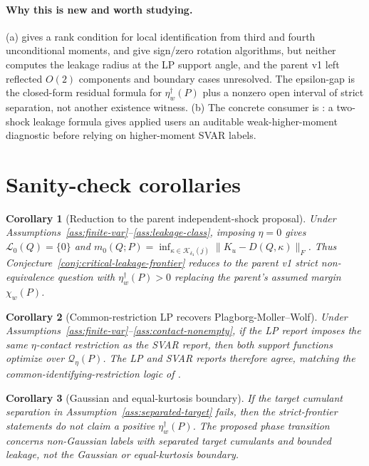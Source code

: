 \documentclass[11pt]{article}
\theoremstyle{definition}
\theoremstyle{plain}
\newtheorem{corollary}{Corollary}
\theoremstyle{remark}
\begin{document}
\paragraph{Why this is new and worth studying.}
(a) \citet[Section~3]{Guay2021} gives a rank condition for local identification from third and fourth unconditional moments, and \citet[Section~2 and Algorithms~1--2]{AriasRubioRamirezWaggoner2018} give sign/zero rotation algorithms, but neither computes the leakage radius at the LP support angle, and the parent v1 left reflected \(O(2)\) components and boundary cases unresolved.  The epsilon-gap is the closed-form residual formula for \(\eta_w^\dagger(P)\) plus a nonzero open interval of strict separation, not another existence witness.  (b) The concrete consumer is \citet{MontielOleaPlagborgMollerQian2022}: a two-shock leakage formula gives applied users an auditable weak-higher-moment diagnostic before relying on higher-moment SVAR labels.

\section{Sanity-check corollaries}
\begin{corollary}[Reduction to the parent independent-shock proposal]\label{cor:parent-reduction}
Under Assumptions~\ref{ass:finite-var}--\ref{ass:leakage-class}, imposing \(\eta=0\) gives \(\mathcal L_0(Q)=\{0\}\) and \(m_0(Q;P)=\inf_{\kappa\in\mathcal K_{\delta_4}(j)}\|K_u-D(Q,\kappa)\|_F\).  Thus Conjecture~\ref{conj:critical-leakage-frontier} reduces to the parent v1 strict non-equivalence question with \(\eta_w^\dagger(P)>0\) replacing the parent's assumed margin \(\chi_w(P)\).
\end{corollary}

\begin{corollary}[Common-restriction LP recovers Plagborg-Moller--Wolf]\label{cor:common-restriction}
Under Assumptions~\ref{ass:finite-var}--\ref{ass:contact-nonempty}, if the LP report imposes the same \(\eta\)-contact restriction as the SVAR report, then both support functions optimize over \(\mathcal Q_\eta(P)\).  The LP and SVAR reports therefore agree, matching the common-identifying-restriction logic of \citet{PlagborgMollerWolf2021}.
\end{corollary}

\begin{corollary}[Gaussian and equal-kurtosis boundary]\label{cor:gaussian-boundary}
If the target cumulant separation in Assumption~\ref{ass:separated-target} fails, then the strict-frontier statements do not claim a positive \(\eta_w^\dagger(P)\).  The proposed phase transition concerns non-Gaussian labels with separated target cumulants and bounded leakage, not the Gaussian or equal-kurtosis boundary.
\end{corollary}
\end{document}
